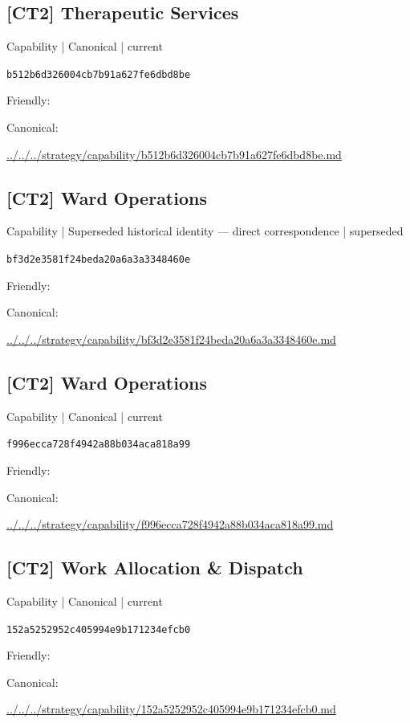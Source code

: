 \documentclass[10pt,a4paper]{article}
\begin{document}
\subsection*{[CT2] Therapeutic Services}
{\small Capability | Canonical | current}\par
\texttt{b512b6d326004cb7b91a627fe6dbd8be}\par
Friendly: \par
Canonical: \par
{\footnotesize\url{../../../strategy/capability/b512b6d326004cb7b91a627fe6dbd8be.md}}\par
\subsection*{[CT2] Ward Operations}
{\small Capability | Superseded historical identity — direct correspondence | superseded}\par
\texttt{bf3d2e3581f24beda20a6a3a3348460e}\par
Friendly: \par
Canonical: \par
{\footnotesize\url{../../../strategy/capability/bf3d2e3581f24beda20a6a3a3348460e.md}}\par
\subsection*{[CT2] Ward Operations}
{\small Capability | Canonical | current}\par
\texttt{f996ecca728f4942a88b034aca818a99}\par
Friendly: \par
Canonical: \par
{\footnotesize\url{../../../strategy/capability/f996ecca728f4942a88b034aca818a99.md}}\par
\subsection*{[CT2] Work Allocation \& Dispatch}
{\small Capability | Canonical | current}\par
\texttt{152a5252952c405994e9b171234efcb0}\par
Friendly: \par
Canonical: \par
{\footnotesize\url{../../../strategy/capability/152a5252952c405994e9b171234efcb0.md}}\par
\end{document}
